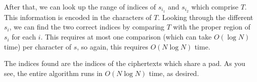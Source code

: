 \documentclass[11pt]{article}
\begin{document}
After that, we can look up the range of indices of $s_{i_1}$ and $s_{i_2}$ which comprise $T$. This information is encoded in the characters of $T$. Looking through the different $s_i$, we can find the two correct indices by comparing $T$ with the proper region of $s_i$ for each $i$. This requires at most one comparison (which can take $O(\log N)$ time) per character of $s$, so again, this requires $O(N \log N)$ time.

The indices found are the indices of the ciphertexts which share a pad. As you see, the entire algorithm runs in $O(N \log N)$ time, as desired.
\end{document}
